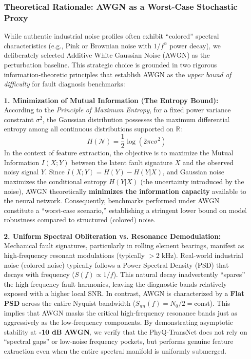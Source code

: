 \documentclass[5p,times,twocolumn]{elsarticle}
\begin{document}
\subsubsection{Theoretical Rationale: AWGN as a Worst-Case Stochastic Proxy}
While authentic industrial noise profiles often exhibit ``colored'' spectral characteristics (e.g., Pink or Brownian noise with $1/f^\alpha$ power decay), we deliberately selected Additive White Gaussian Noise (AWGN) as the perturbation baseline. This strategic choice is grounded in two rigorous information-theoretic principles that establish AWGN as the \textit{upper bound of difficulty} for fault diagnosis benchmarks:

\textbf{1. Minimization of Mutual Information (The Entropy Bound):}
According to the \textit{Principle of Maximum Entropy}, for a fixed power variance constraint $\sigma^2$, the Gaussian distribution possesses the maximum differential entropy among all continuous distributions supported on $\mathbb{R}$:
\begin{equation}
    H(\mathcal{N}) = \frac{1}{2} \log(2\pi e \sigma^2)
\end{equation}
In the context of feature extraction, the objective is to maximize the Mutual Information $I(X; Y)$ between the latent fault signature $X$ and the observed noisy signal $Y$. Since $I(X; Y) = H(Y) - H(Y|X)$, and Gaussian noise maximizes the conditional entropy $H(Y|X)$ (the uncertainty introduced by the noise), AWGN theoretically \textbf{minimizes the information capacity} available to the neural network. Consequently, benchmarks performed under AWGN constitute a ``worst-case scenario,'' establishing a stringent lower bound on model robustness compared to structured (colored) noise.

\textbf{2. Uniform Spectral Obliteration vs. Resonance Demodulation:}
Mechanical fault signatures, particularly in rolling element bearings, manifest as high-frequency resonant modulations (typically $>2 \text{ kHz}$). 
Real-world industrial noise (colored noise) typically follows a Power Spectral Density (PSD) that decays with frequency ($S(f) \propto 1/f$). This natural decay inadvertently ``spares'' the high-frequency fault harmonics, leaving the diagnostic bands relatively exposed with a higher local SNR.
In contrast, AWGN is characterized by a \textbf{Flat PSD} across the entire Nyquist bandwidth ($S_{nn}(f) = N_0/2 = \text{const}$). This implies that AWGN masks the critical high-frequency resonance bands just as aggressively as the low-frequency components. By demonstrating asymptotic stability at \textbf{-10 dB AWGN}, we verify that the PhyQ-TransNet does not rely on ``spectral gaps'' or low-noise frequency pockets, but performs genuine feature extraction even when the entire spectral manifold is uniformly submerged.
\end{document}
